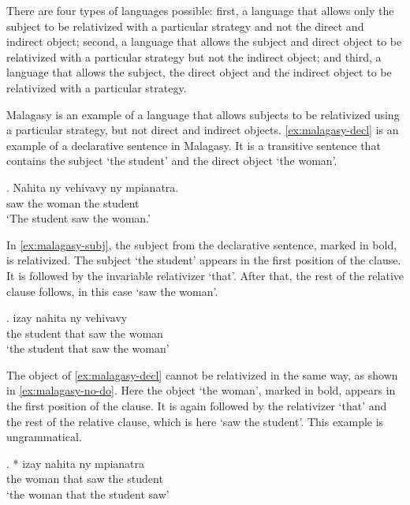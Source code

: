 There are four types of languages possible: first, a language that allows only the subject to be relativized with a particular strategy and not the direct and indirect object; second, a language that allows the subject and direct object to be relativized with a particular strategy but not the indirect object; and third, a language that allows the subject, the direct object and the indirect object to be relativized with a particular strategy.

Malagasy is an example of a language that allows subjects to be relativized using a particular strategy, but not direct and indirect objects. \ref{ex:malagasy-decl} is an example of a declarative sentence in Malagasy. It is a transitive sentence that contains the subject  `the student' and the direct object  `the woman'.

\exg. Nahita ny vehivavy ny mpianatra.\\
 saw the woman the student\\
 `The student saw the woman.' \label{ex:malagasy-decl}

In \ref{ex:malagasy-subj}, the subject from the declarative sentence, marked in bold, is relativized. The subject  `the student' appears in the first position of the clause. It is followed by the invariable relativizer  `that'. After that, the rest of the relative clause follows, in this case  `saw the woman'.

\exg.   izay nahita ny vehivavy\\
 the student that saw the woman\\
 `the student that saw the woman' \label{ex:malagasy-subj}

The object of \ref{ex:malagasy-decl} cannot be relativized in the same way, as shown in \ref{ex:malagasy-no-do}. Here the object  `the woman', marked in bold, appears in the first position of the clause. It is again followed by the relativizer  `that' and the rest of the relative clause, which is here  `saw the student'. This example is ungrammatical.

\exg. *  izay nahita ny mpianatra\\
 the woman that saw the student\\
 `the woman that the student saw' \label{ex:malagasy-no-do}

